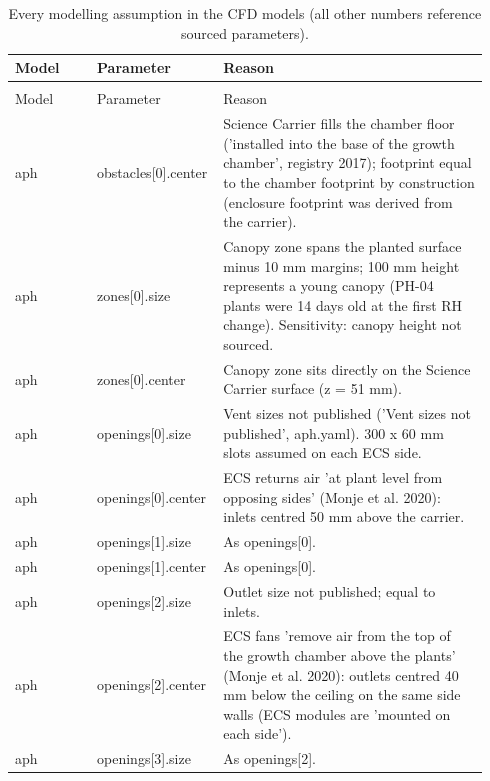 \footnotesize
\begin{longtable}{>{\raggedright\arraybackslash}p{0.17\linewidth}>{\raggedright\arraybackslash}p{0.22\linewidth}>{\raggedright\arraybackslash}p{0.55\linewidth}}
\caption{Every modelling assumption in the CFD models (all other numbers reference sourced parameters).}\label{tab:assumptions}\\
\toprule Model & Parameter & Reason \\ \midrule \endfirsthead
\multicolumn{3}{l}{\emph{Table~\ref{tab:assumptions}, continued}}\\
\toprule Model & Parameter & Reason \\ \midrule \endhead
aph & obstacles[0]\allowbreak{}.\allowbreak{}center & Science Carrier fills the chamber floor ('installed into the base of the growth chamber', registry 2017); footprint equal to the chamber footprint by construction (enclosure footprint was derived from the carrier). \\
aph & zones[0]\allowbreak{}.\allowbreak{}size & Canopy zone spans the planted surface minus 10 mm margins; 100 mm height represents a young canopy (PH-04 plants were 14 days old at the first RH change). Sensitivity: canopy height not sourced. \\
aph & zones[0]\allowbreak{}.\allowbreak{}center & Canopy zone sits directly on the Science Carrier surface (z = 51 mm). \\
aph & openings[0]\allowbreak{}.\allowbreak{}size & Vent sizes not published ('Vent sizes not published', aph.yaml). 300 x 60 mm slots assumed on each ECS side. \\
aph & openings[0]\allowbreak{}.\allowbreak{}center & ECS returns air 'at plant level from opposing sides' (Monje et al. 2020): inlets centred 50 mm above the carrier. \\
aph & openings[1]\allowbreak{}.\allowbreak{}size & As openings[0]. \\
aph & openings[1]\allowbreak{}.\allowbreak{}center & As openings[0]. \\
aph & openings[2]\allowbreak{}.\allowbreak{}size & Outlet size not published; equal to inlets. \\
aph & openings[2]\allowbreak{}.\allowbreak{}center & ECS fans 'remove air from the top of the growth chamber above the plants' (Monje et al. 2020): outlets centred 40 mm below the ceiling on the same side walls (ECS modules are 'mounted on each side'). \\
aph & openings[3]\allowbreak{}.\allowbreak{}size & As openings[2]. \\

\end{longtable}
